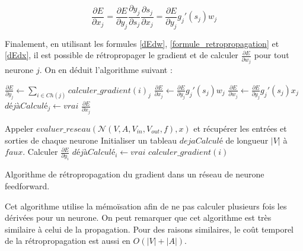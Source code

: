 \begin{equation}
\frac{\partial E}{\partial x_j} = \frac{\partial E}{\partial y_j}\frac{\partial y_j}{\partial s_j}\frac{\partial s_j}{\partial x_j} =  \frac{\partial E}{\partial y_j} g_j'(s_j) w_j
\label{dEdx}
\end{equation}

Finalement, en utilisant les formules \ref{dEdw}, \ref{formule_retropropagation} et \ref{dEdx}, il est possible de rétropropager le gradient et de calculer $\frac{\partial E}{\partial w_j}$ pour tout neurone $j$. On en déduit l'algorithme suivant :

\begin{algorithm} 
\begin{algorithmic}
		\State $\frac{\partial E}{\partial y_j} \leftarrow \sum_{i \in Ch(j)}{calculer\_gradient(i)_j}$
		\State $\frac{\partial E}{\partial x_j} \leftarrow \frac{\partial E}{\partial y_j} g_j'(s_j) w_j$
		\State $\frac{\partial E}{\partial w_j} \leftarrow \frac{\partial E}{\partial y_j} g_j'(s_j) x_j$
		\State $déjàCalculé_j \leftarrow vrai$
	\EndIf
	\State \Return $\frac{\partial E}{\partial x_j}$
\EndFunction

\State Appeler $evaluer\_reseau(\mathcal{N}(V, A, V_{in}, V_{out}, f), x)$ et récupérer les entrées et sorties de chaque neurone
\State Initialiser un tableau $dejaCalculé$ de longueur $|V|$ à $faux$.
	\State Calculer $\frac{\partial E}{\partial y_i}$
	\State $déjàCalculé_i \leftarrow vrai$ 
\EndFor
{}
	\State $calculer\_gradient(i)$ 
\EndFor
\EndProcedure
\end{algorithmic} 
\caption{Algorithme de rétropropagation du gradient dans un réseau de neurone feedforward.}
\label{propagation_memoisation2}
\end{algorithm}

Cet algorithme utilise la mémoïsation afin de ne pas calculer plusieurs fois les dérivées pour un neurone. On peut remarquer que cet algorithme est très similaire à celui de la propagation. Pour des raisons similaires, le coût temporel de la rétropropagation est aussi en $O(|V|+|A|)$.